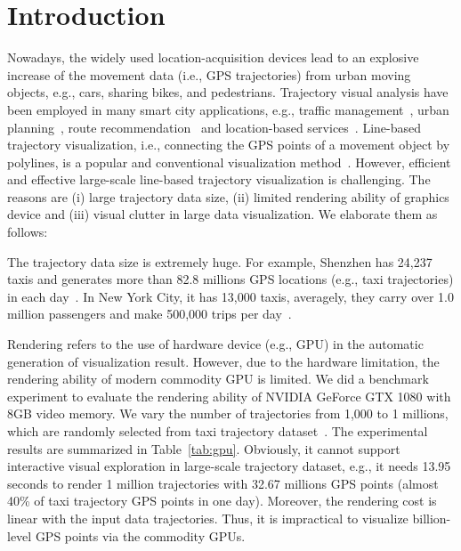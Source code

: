 \section{Introduction}\label{sec:intro}
Nowadays, the widely used location-acquisition devices lead to an explosive increase of the movement data (i.e., GPS trajectories) from urban moving objects, e.g., cars, sharing bikes, and pedestrians.
Trajectory visual analysis have been employed in many smart city applications, e.g.,  traffic management~\cite{wang2014visual}, urban planning~\cite{tang2017efficient}, route recommendation~\cite{zheng2011learning} and location-based services~\cite{liu2016smartadp, zheng2010collaborative}.
Line-based trajectory visualization, i.e., connecting the GPS points of a movement object by polylines, is a popular and conventional visualization method~\cite{chen2015survey}.
However, efficient and effective large-scale line-based trajectory visualization is challenging.
The reasons are (i) large trajectory data size, (ii) limited rendering ability of graphics device and (iii) visual clutter in large data visualization.
We elaborate them as follows:

 The trajectory data size is extremely huge.
For example, Shenzhen has 24,237 taxis and generates more than 82.8 millions GPS locations (e.g., taxi trajectories) in each day~\cite{sz}. %
In New York City, it has 13,000 taxis, averagely, they carry over 1.0 million passengers and make 500,000 trips per day~\cite{ferreira2013visual}.

Rendering refers to the use of hardware device (e.g., GPU) in the automatic generation of visualization result.
However, due to the hardware limitation, the rendering ability of modern commodity GPU is limited.
We did a benchmark experiment to evaluate the rendering ability of NVIDIA GeForce GTX 1080 with 8GB video memory.
We vary the number of trajectories from 1,000 to 1 millions, which are randomly selected from \pt{} taxi trajectory dataset~\cite{pt}.%
The experimental results are summarized in Table~\ref{tab:gpu}.
Obviously, it cannot support interactive visual exploration in large-scale trajectory dataset, e.g.,
it needs 13.95 seconds to render 1 million trajectories with 32.67 millions GPS points (almost 40\% of \sz{} taxi trajectory GPS points in one day).
Moreover, the rendering cost is linear with the input data trajectories.
Thus, it is impractical to visualize billion-level GPS points via the commodity GPUs.

